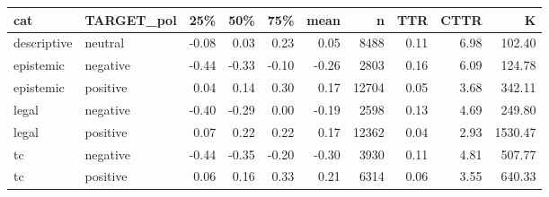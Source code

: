 \begin{table}[ht]
\centering
\begin{tabular}{llrrrrrrrr}
  \hline
cat & TARGET\_pol & 25\% & 50\% & 75\% & mean & n & TTR & CTTR & K \\ 
  \hline
descriptive & neutral & -0.08 & 0.03 & 0.23 & 0.05 & 8488 & 0.11 & 6.98 & 102.40 \\ 
  epistemic & negative & -0.44 & -0.33 & -0.10 & -0.26 & 2803 & 0.16 & 6.09 & 124.78 \\ 
  epistemic & positive & 0.04 & 0.14 & 0.30 & 0.17 & 12704 & 0.05 & 3.68 & 342.11 \\ 
  legal & negative & -0.40 & -0.29 & 0.00 & -0.19 & 2598 & 0.13 & 4.69 & 249.80 \\ 
  legal & positive & 0.07 & 0.22 & 0.22 & 0.17 & 12362 & 0.04 & 2.93 & 1530.47 \\ 
  tc & negative & -0.44 & -0.35 & -0.20 & -0.30 & 3930 & 0.11 & 4.81 & 507.77 \\ 
  tc & positive & 0.06 & 0.16 & 0.33 & 0.21 & 6314 & 0.06 & 3.55 & 640.33 \\ 
   \hline
\end{tabular}
\end{table}
